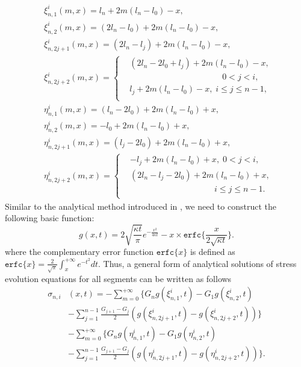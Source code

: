 \begin{equation} \label{generalNotations}
\begin{split}
&\xi_{n,1}^{i}(m,x)=l_n+2m(l_n-l_0)-x,\\
&\xi_{n,2}^{i}(m,x)=(2l_n-l_0)+2m(l_n-l_0)-x,\\
&\xi_{n,2j+1}^{i}(m,x)=(2l_n-l_j)+2m(l_n-l_0)-x,\\
&\xi_{n,2j+2}^{i}(m,x)=\left\{
   \begin{aligned}
   &(2l_n-2l_0+l_j)+2m(l_n-l_0)-x,\;\\
   &\qquad\qquad\qquad\qquad\qquad\quad 0<j<i,  \\
   &l_j+2m(l_n-l_0)-x,\;i\leq j\leq n-1, \\
      \end{aligned}
   \right. \\
&\eta_{n,1}^{i}(m,x)=(l_n-2l_0)+2m(l_n-l_0)+x,\\
&\eta_{n,2}^{i}(m,x)=-l_0+2m(l_n-l_0)+x,\\
&\eta_{n,2j+1}^{i}(m,x)=(l_j-2l_0)+2m(l_n-l_0)+x,\\
&\eta_{n,2j+2}^{i}(m,x)=\left\{
   \begin{aligned}
   &-l_j+2m(l_n-l_0)+x,\;0<j<i,  \\
   &(2l_n-l_j-2l_0)+2m(l_n-l_0)+x,\; \\
   &\qquad\qquad\qquad\qquad\qquad i\leq j \leq n-1. \\
   \end{aligned}
   \right.
\end{split}
\end{equation}
Similar to the analytical method introduced in \cite{?}, we need to construct the following basic function:
\begin{equation} \label{general_basisFunc}
g(x,t)=2\sqrt{\frac{\kappa t}{\pi}}e^{-\frac{x^2}{4\kappa
t}}-x\times\texttt{erfc}\{\frac{x}{2\sqrt{\kappa t}}\}.
\end{equation}
where the complementary error function $\texttt{erfc}\{x\}$ is defined as $\texttt{erfc}\{x\}=\frac{2}{\sqrt{\pi}}\int_x^{+\infty}e^{-t^2}dt$. Thus, a general form of analytical solutions of stress evolution equations for all segments can be written as follows
\begin{equation} \label{eq:general_solution}
\begin{split}
\sigma_{n,i}&(x,t)=-\sum\limits_{m=0}^{+\infty}\{G_ng(\xi_{n,1}^{i},t)-G_1g(\xi_{n,2}^{i},t)\\
&-\sum\limits_{j=1}^{n-1}\frac{G_{j+1}-G_j}{2}(g(\xi_{n,2j+1}^{i},t)-g(\xi_{n,2j+2}^{i},t))\}\\
&-\sum\limits_{m=0}^{+\infty}\{G_ng(\eta_{n,1}^{i},t)-G_1g(\eta_{n,2}^{i},t)\\
&-\sum\limits_{j=1}^{n-1}\frac{G_{j+1}-G_j}{2}(g(\eta_{n,2j+1}^{i},t)-g(\eta_{n,2j+2}^{i},t))\}.
 \end{split}
 \end{equation}

